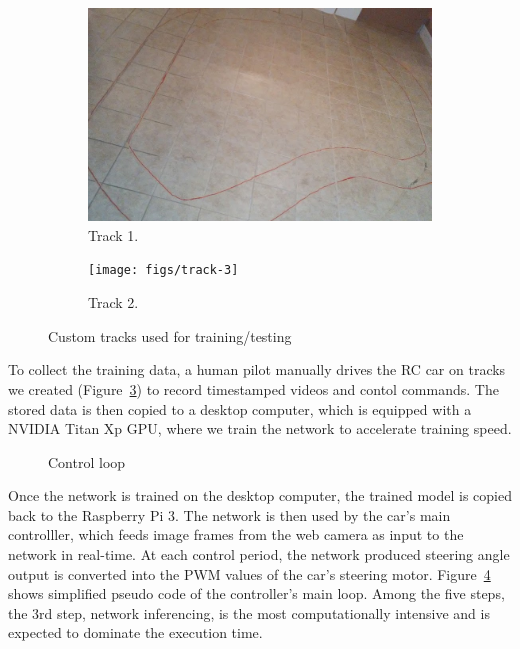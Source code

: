\begin{figure}[h]
  \centering
  \begin{subfigure}{0.4\textwidth}
    \includegraphics[width=\textwidth]{figs/track-2}
    \caption{Track 1.}
    \label{fig:track}
  \end{subfigure}
  \hfill
  \begin{subfigure}{0.4\textwidth}
    \texttt{[image: figs/track-3]}
    \caption{Track 2.}
    \label{fig:track2}
  \end{subfigure}
  \caption{Custom tracks used for training/testing}
  \label{fig:tracks}
\end{figure}

To collect the training data, a human pilot manually drives the RC car
on tracks we created (Figure~\ref{fig:tracks}) to record
timestamped videos and contol commands. The stored data is then copied 
to a desktop computer, which is equipped with a NVIDIA Titan Xp GPU, 
where we train the network to accelerate training speed.


\begin{figure}[h]
  
  \caption{Control loop}
  \label{fig:controlloop}
\end{figure}

Once the network is trained on the desktop computer, the trained model
is copied back to the Raspberry Pi 3. The network is then used
by the car's main controlller, which feeds image frames from the web
camera as input to the network in real-time. At each control period,
the network produced steering angle output is converted into the PWM values
of the car's steering motor. Figure~\ref{fig:controlloop} shows simplified 
pseudo code of the controller's main loop. Among the five steps, the 3rd step, 
network inferencing, is the most computationally intensive and is expected to 
dominate the execution time.

